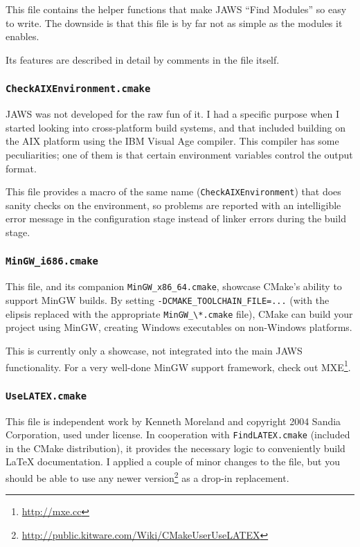 This file contains the helper functions that make JAWS ``Find Modules'' so easy to write. The downside is that this file is by far not as simple as the modules it enables.

Its features are described in detail by comments in the file itself.

\subsubsection{\texttt{CheckAIXEnvironment.cmake}}

JAWS was not developed for the raw fun of it. I had a specific purpose when I started looking into cross-platform build systems, and that included building on the AIX platform using the IBM Visual Age compiler. This compiler has some peculiarities; one of them is that certain environment variables control the output format.

This file provides a macro of the same name (\lstinline{CheckAIXEnvironment}) that does sanity checks on the environment, so problems are reported with an intelligible error message in the configuration stage instead of linker errors during the build stage.

\subsubsection{\texttt{MinGW_i686.cmake}}

This file, and its companion \lstinline{MinGW_x86_64.cmake}, showcase CMake's ability to support MinGW builds. By setting \lstinline{-DCMAKE_TOOLCHAIN_FILE=...} (with the elipsis replaced with the appropriate \lstinline{MinGW_\*.cmake} file), CMake can build your project using MinGW, creating Windows executables on non-Windows platforms.

This is currently only a showcase, not integrated into the main JAWS functionality. For a very well-done MinGW support framework, check out MXE\footnote{\url{http://mxe.cc}}.

\subsubsection{\texttt{UseLATEX.cmake}}

This file is independent work by Kenneth Moreland and copyright 2004 Sandia Corporation, used under license. In cooperation with \lstinline{FindLATEX.cmake} (included in the CMake distribution), it provides the necessary logic to conveniently build \LaTeX{} documentation. I applied a couple of minor changes to the file, but you should be able to use any newer version\footnote{\url{http://public.kitware.com/Wiki/CMakeUserUseLATEX}} as a drop-in replacement.

